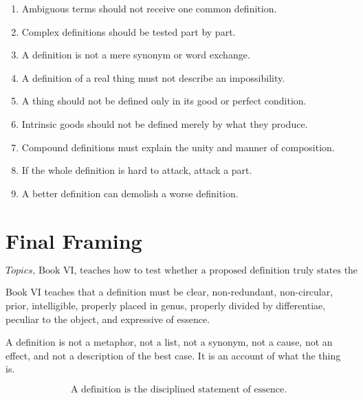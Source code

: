 \documentclass[12pt]{article}
\begin{document}
\begin{enumerate}[itemsep=0.5em]
    \item Ambiguous terms should not receive one common definition.

    \item Complex definitions should be tested part by part.

    \item A definition is not a mere synonym or word exchange.

    \item A definition of a real thing must not describe an impossibility.

    \item A thing should not be defined only in its good or perfect condition.

    \item Intrinsic goods should not be defined merely by what they produce.

    \item Compound definitions must explain the unity and manner of composition.

    \item If the whole definition is hard to attack, attack a part.

    \item A better definition can demolish a worse definition.
\end{enumerate}

\section*{Final Framing}

\[
\boxed{
\textit{Topics}, \text{ Book VI, teaches how to test whether a proposed definition truly states the essence.}
}
\]

Book VI teaches that a definition must be clear, non-redundant, non-circular,
prior, intelligible, properly placed in genus, properly divided by
differentiae, peculiar to the object, and expressive of essence.

A definition is not a metaphor, not a list, not a synonym, not a cause, not an
effect, and not a description of the best case. It is an account of what the
thing is.

\[
\boxed{
\text{A definition is the disciplined statement of essence.}
}
\]
\end{document}
